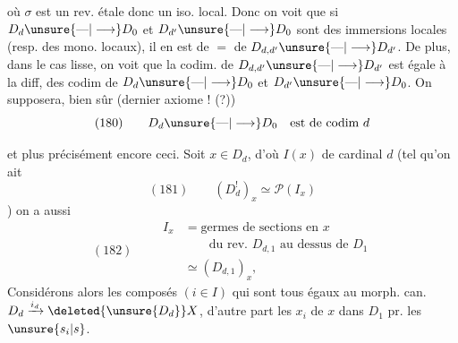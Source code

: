 où $\sigma$ est un rev. étale donc un iso. local. Donc on voit que si $D_d\unsure{\text{---}|\longrightarrow}D_0$ et $D_{d'}\unsure{\text{---}|\longrightarrow}D_0$ sont des immersions locales (resp. des mono. locaux), il en est de $=$ de $D_{d,d'}\unsure{\text{---}|\longrightarrow}D_{d'}$. De plus, dans le cas lisse, on voit que la codim. de $D_{d,d'}\unsure{\text{---}|\longrightarrow}D_{d'}$ est égale à la diff, des codim de $D_d\unsure{\text{---}|\longrightarrow}D_0$ et $D_{d'}\unsure{\text{---}|\longrightarrow}D_0$. On supposera, bien sûr (dernier axiome ! (?))
\[
(180)\qquad D_d\unsure{\text{---}|\longrightarrow}D_0\quad\text{est de codim }d
\]

 et plus précisément encore ceci. Soit  $x\in D_d$, d'où $I(x)$ de cardinal $d$ (tel qu'on ait
\[
(181)\qquad(D_d^!)_x\simeq\mathcal P(I_x)
\]
)
  on a aussi
\[
(182)\qquad\begin{aligned}
I_x&=\text{germes de sections en }x\\
&\qquad\text{du rev. }D_{d,1}\text{ au dessus de }D_1\\
&\simeq(D_{d,1})_x,
\end{aligned}
\]
Considérons alors les composés $(i\in I)$
qui sont tous égaux au morph. can. $D_d\xrightarrow{i_d}\deleted{\unsure{D_d}}X$, d'autre part les   $x_i$ de $x$ dans $D_1$ pr. les $\unsure{s_i|s}$.
